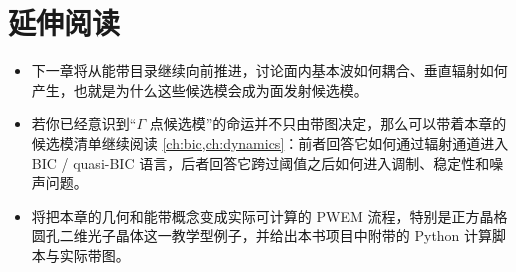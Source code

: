 \section*{延伸阅读}
\begin{itemize}
  \item 下一章将从能带目录继续向前推进，讨论面内基本波如何耦合、垂直辐射如何产生，也就是为什么这些候选模会成为面发射候选模。

  \item 若你已经意识到“$\Gamma$ 点候选模”的命运并不只由带图决定，那么可以带着本章的候选模清单继续阅读 \cref{ch:bic,ch:dynamics}：前者回答它如何通过辐射通道进入 BIC / quasi-BIC 语言，后者回答它跨过阈值之后如何进入调制、稳定性和噪声问题。

  \item \hyperref[ch:pwe]{} 将把本章的几何和能带概念变成实际可计算的 PWEM 流程，特别是正方晶格圆孔二维光子晶体这一教学型例子，并给出本书项目中附带的 Python 计算脚本与实际带图。
\end{itemize}
